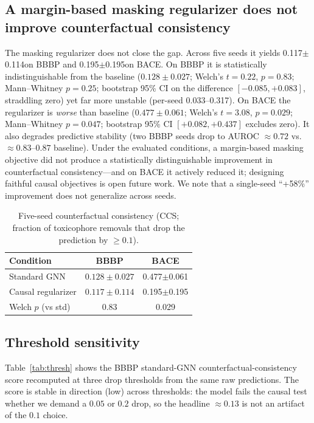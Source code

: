 \documentclass[conference]{IEEEtran}
\newcommand{\Fcausalreg}{0.117}
\newcommand{\Fcausalregsd}{0.114} %
\newcommand{\BACEcausalstd}{0.477}
\newcommand{\BACEcausalstdsd}{0.061} %
\newcommand{\BACEcausalreg}{0.195}
\newcommand{\BACEcausalregsd}{0.195} %
\begin{document}
\subsection{A margin-based masking regularizer does not improve counterfactual consistency}
\label{sec:reg}
The masking regularizer does not close the gap. Across five seeds it yields \Fcausalreg$\pm$\Fcausalregsd on BBBP and \BACEcausalreg$\pm$\BACEcausalregsd on BACE. On BBBP it is statistically indistinguishable from the baseline ($0.128\pm0.027$; Welch's $t=0.22$, $p=0.83$; Mann--Whitney $p=0.25$; bootstrap 95\% CI on the difference $[-0.085, +0.083]$, straddling zero) yet far more unstable (per-seed 0.033--0.317). On BACE the regularizer is \emph{worse} than baseline ($0.477\pm0.061$; Welch's $t=3.08$, $p=0.029$; Mann--Whitney $p=0.047$; bootstrap 95\% CI $[+0.082, +0.437]$ excludes zero). It also degrades predictive stability (two BBBP seeds drop to AUROC $\approx 0.72$ vs.~$\approx 0.83$--$0.87$ baseline). Under the evaluated conditions, a margin-based masking objective did not produce a statistically distinguishable improvement in counterfactual consistency---and on BACE it actively reduced it; designing faithful causal objectives is open future work. We note that a single-seed ``+58\%'' improvement does not generalize across seeds.

\begin{table}[t]
\centering
\caption{Five-seed counterfactual consistency (CCS; fraction of toxicophore removals that drop the prediction by $\geq 0.1$).}
\label{tab:faith}
\begin{tabular}{lcc}
\toprule
Condition & BBBP & BACE \\
\midrule
Standard GNN & $0.128\pm0.027$ & \BACEcausalstd$\pm$\BACEcausalstdsd \\
Causal regularizer & $0.117\pm0.114$ & \BACEcausalreg$\pm$\BACEcausalregsd \\
\midrule
Welch $p$ (vs std) & 0.83 & 0.029 \\
\bottomrule
\end{tabular}
\end{table}

\subsection{Threshold sensitivity}
Table~\ref{tab:thresh} shows the BBBP standard-GNN counterfactual-consistency score recomputed at three drop thresholds from the same raw predictions. The score is stable in direction (low) across thresholds: the model fails the causal test whether we demand a $0.05$ or $0.2$ drop, so the headline $\approx 0.13$ is not an artifact of the $0.1$ choice.
\end{document}
